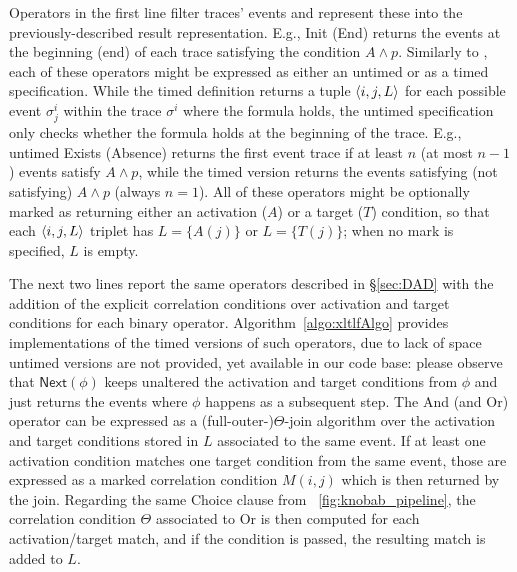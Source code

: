 Operators in the first line filter traces' events and represent these into the previously-described result representation. 
E.g., \textsf{Init} (\textsf{End}) returns the events at the beginning (end) of each trace satisfying the condition $A\wedge p$. Similarly to \cite{BurattinMS16}, each of these operators might be expressed as either an untimed or as a timed specification. While the timed definition returns a tuple $\braket{i,j,L}$ for each possible event $\sigma^i_j$ within the trace $\sigma^i$ where the formula holds, the untimed specification only checks whether the formula holds at the beginning of the trace. E.g., untimed \textsf{Exists} (\textsf{Absence}) returns the first event trace if at least $n$ (at most $n-1$) events satisfy $A\wedge p$, while the timed version returns the events satisfying (not satisfying) $A\wedge p$ (always $n=1$). All of these operators might be optionally marked as returning either an activation ($A$) or a target ($T$) condition, so that each  $\braket{i,j,L}$ triplet has $L=\{A(j)\}$ or $L=\{T(j)\}$; when no mark is specified, $L$ is empty.

The next two lines report the same operators described in \S\ref{sec:DAD} with the addition of the explicit correlation conditions over activation and target conditions for each binary operator. Algorithm~\ref{algo:xltlfAlgo} provides  implementations of the timed versions of such operators, due to lack of space untimed versions are not provided, yet available in our code base: please observe that $\textsf{Next}(\phi)$ keeps unaltered the activation and target conditions from $\phi$ and just returns the events where $\phi$ happens as a subsequent step. The \textsf{And} (and \textsf{Or}) operator can be expressed as a (full-outer-)$\Theta$-join algorithm over the activation and target conditions stored in $L$ associated to the same event. If at least one activation condition matches one target condition from the same event, those are expressed as a marked correlation condition $M(i,j)$ which is then returned by the join. Regarding the same \textsf{Choice} clause from \figurename~\ref{fig:knobab_pipeline}, the correlation condition $\Theta$ associated to \textsf{Or} is then computed for each activation/target match, and if the condition is passed, the resulting match is added to $L$. 


